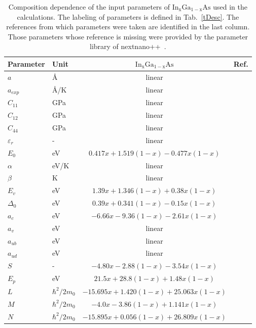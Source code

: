 
\begin{table*}[!ht]
	\caption{Composition dependence of the input parameters of $\mathrm{In_xGa_{1-x}As}$ used in the calculations. The labeling of parameters is defined in Tab.~\ref{tDesc}. The references from which parameters were taken are identified in the last column. Those parameters whose reference is missing were provided by the parameter library of nextnano++~\cite{next}.\label{tSb3}
	}
	\begin{center}
		\begin{tabular}{llcc}
			\hline \hline
			Parameter & Unit & $\mathrm{In_xGa_{1-x}As}$ & Ref.\\
			\hline
			$a$ & \AA & linear & \\
			$a_{exp}$ & \AA /K & linear & \\
			$C_{11}$ & GPa& linear &  \\
			$C_{12}$ & GPa& linear &  \\
			$C_{44}$ & GPa& linear & \\
			$\varepsilon_{r}$ & -& linear & \\
			$E_0$ & eV & $0.417x+1.519(1-x)-0.477x(1-x)$ & \cite{Vurgaftman}\\
			$\alpha$ & eV/K & linear & \\
			$\beta$ & K & linear & \\
			$E_v$ & eV & $1.39x+1.346(1-x)+0.38x(1-x)$& \cite{Vurgaftman}\\
			$\Delta_0$ & eV & $0.39x+0.341(1-x)-0.15x(1-x)$& \cite{Vurgaftman}\\
			$a_c$ & eV & $-6.66x-9.36(1-x)-2.61x(1-x)$& \cite{Vurgaftman}\\
			$a_v$ & eV & linear & \\
			$a_{ub}$ & eV & linear& \\
			$a_{ud}$ & eV & linear& \\
			$S$ & -& $-4.80x-2.88(1-x)-3.54x(1-x)$& \cite{Vurgaftman}\\
			$E_p$ & eV & $21.5x+28.8(1-x)+1.48x(1-x)$& \cite{Vurgaftman}\\
			$L$ & $\hbar^2/2m_0$ & $-15.695x+1.420(1-x)+25.063x(1-x)$& \cite{Vurgaftman}\\
			$M$ & $\hbar^2/2m_0$ & $-4.0x-3.86(1-x)+1.141x(1-x)$& \cite{Vurgaftman}\\
			$N$ & $\hbar^2/2m_0$ & $-15.895x+0.056(1-x)+26.809x(1-x)$& \cite{Vurgaftman}\\
			\hline \hline
		\end{tabular}
	\end{center}
\end{table*}

\newpage 